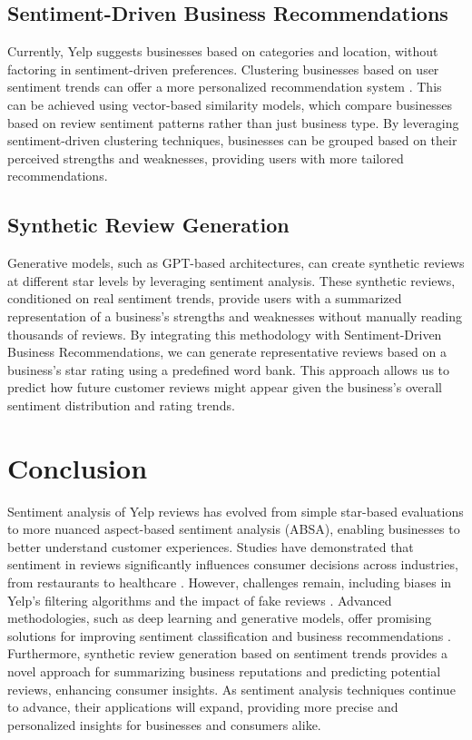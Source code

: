\documentclass{article}
\begin{document}
\subsection{Sentiment-Driven Business Recommendations}
Currently, Yelp suggests businesses based on categories and location, without factoring in sentiment-driven preferences. Clustering businesses based on user sentiment trends can offer a more personalized recommendation system \citep{KellerKostromitina2020}. This can be achieved using vector-based similarity models, which compare businesses based on review sentiment patterns rather than just business type. By leveraging sentiment-driven clustering techniques, businesses can be grouped based on their perceived strengths and weaknesses, providing users with more tailored recommendations.

\subsection{Synthetic Review Generation}
Generative models, such as GPT-based architectures, can create synthetic reviews at different star levels by leveraging sentiment analysis. These synthetic reviews, conditioned on real sentiment trends, provide users with a summarized representation of a business’s strengths and weaknesses without manually reading thousands of reviews. By integrating this methodology with Sentiment-Driven Business Recommendations, we can generate representative reviews based on a business's star rating using a predefined word bank. This approach allows us to predict how future customer reviews might appear given the business’s overall sentiment distribution and rating trends.

\section{Conclusion}

Sentiment analysis of Yelp reviews has evolved from simple star-based evaluations to more nuanced aspect-based sentiment analysis (ABSA), enabling businesses to better understand customer experiences. Studies have demonstrated that sentiment in reviews significantly influences consumer decisions across industries, from restaurants to healthcare \citep{HuLiu2004, ChenLee2024}. However, challenges remain, including biases in Yelp’s filtering algorithms and the impact of fake reviews \citep{Mukherjee2021}. Advanced methodologies, such as deep learning and generative models, offer promising solutions for improving sentiment classification and business recommendations \citep{Aziz2024}. Furthermore, synthetic review generation based on sentiment trends provides a novel approach for summarizing business reputations and predicting potential reviews, enhancing consumer insights. As sentiment analysis techniques continue to advance, their applications will expand, providing more precise and personalized insights for businesses and consumers alike.

\newpage

\nocite{*}

\end{document}
